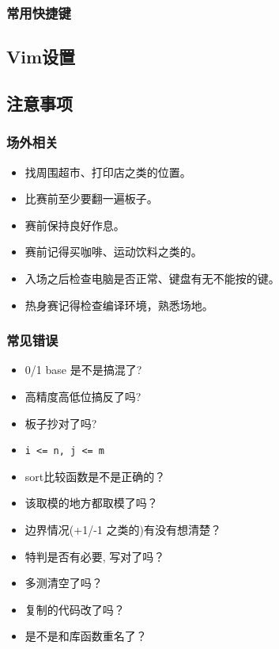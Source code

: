 \documentclass[a4paper, twoside]{article}
\begin{document}
    \subsubsection{常用快捷键}

\subsection{Vim设置}

\subsection{注意事项}

    \subsubsection{场外相关}
    \begin{itemize}
        \item 找周围超市、打印店之类的位置。
        \item 比赛前至少要翻一遍板子。
        \item 赛前保持良好作息。
        \item 赛前记得买咖啡、运动饮料之类的。
        \item 入场之后检查电脑是否正常、键盘有无不能按的键。
        \item 热身赛记得检查编译环境，熟悉场地。
    \end{itemize}

    \subsubsection{常见错误}
    \begin{itemize}
        \item 0/1 base 是不是搞混了?
        \item 高精度高低位搞反了吗?
        \item 板子抄对了吗?
        \item \texttt{i <= n, j <= m}
        \item sort比较函数是不是正确的？
        \item 该取模的地方都取模了吗？
        \item 边界情况(+1/-1 之类的)有没有想清楚？
        \item 特判是否有必要, 写对了吗？
        \item 多测清空了吗？
        \item 复制的代码改了吗？
        \item 是不是和库函数重名了？
    \end{itemize}
\end{document}
